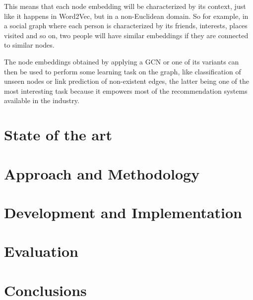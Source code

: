 \documentclass[%
    corpo=13.5pt,
    twoside,
    oldstyle,
    tipotesi=magistrale,
    greek,
    evenboxes
]{toptesi}
\begin{document}
This means that each node embedding will be characterized by its context,
just like it happens in Word2Vec, but in a non-Euclidean domain.
So for example, in a social graph where each person is characterized by its
friends, interests, places visited and so on, two people will have similar
embeddings if they are connected to similar nodes.

The node embeddings obtained by applying a GCN or one of its variants can
then be used to perform some learning task on the graph, like classification
of unseen nodes or link prediction of non-existent edges, the latter being
one of the most interesting task because it empowers most of the
recommendation systems available in the industry.



\chapter{State of the art}










\chapter{Approach and Methodology}

\chapter{Development and Implementation}

\chapter{Evaluation}

\chapter{Conclusions}




\end{document}

